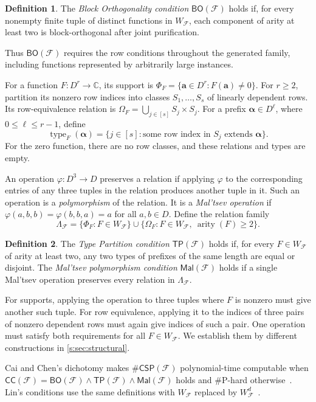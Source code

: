 \documentclass[11pt,letterpaper,onecolumn]{article}
\theoremstyle{plain}
\theoremstyle{definition}
\newtheorem{definition}[definition]{Definition}
\theoremstyle{remark}
\newcommand{\cF}{\mathcal F}
\newcommand{\CC}{\mathsf{CC}}
\newcommand{\BO}{\mathsf{BO}}
\newcommand{\TP}{\mathsf{TP}}
\newcommand{\Mal}{\mathsf{Mal}}
\newcommand{\CSP}[1]{\mathsf{\#CSP}(#1)}
\newcommand{\WFdeg}[1]{W_{\cF}^{#1}}
\newcommand{\SuppRel}[1]{\Phi_{#1}}
\newcommand{\RowEq}[1]{\Omega_{#1}}
\DeclareMathOperator{\arity}{arity}
\DeclareMathOperator{\typeop}{type}
\begin{document}
\begin{definition}
\label{s:def:bo}
The \emph{Block Orthogonality condition} $\BO(\cF)$ holds if, for every
nonempty finite tuple of distinct functions in $W_{\cF}$, each component
of arity at least two is block-orthogonal after joint purification.
\end{definition}

Thus $\BO(\cF)$ requires the row conditions throughout the generated
family, including functions represented by arbitrarily large instances.

For a function $F:D^r\to\mathbb C$, its support is
$\SuppRel F=\{\mathbf a\in D^r:F(\mathbf a)\ne0\}$.
For $r\ge2$, partition its nonzero row indices into classes
$S_1,\ldots,S_s$ of linearly dependent rows. Its row-equivalence relation
is $\RowEq F=\bigcup_{j\in[s]}S_j\times S_j$.
For a prefix $\boldsymbol\alpha\in D^\ell$, where $0\le\ell\le r-1$,
define
\[
 \typeop_F(\boldsymbol\alpha)
 =\{j\in[s]:\text{some row index in }S_j
                  \text{ extends }\boldsymbol\alpha\}.
\]
For the zero function, there are no row classes, and these relations
and types are empty.

An operation $\varphi:D^3\to D$ preserves a relation if applying
$\varphi$ to the corresponding entries of any three tuples in the
relation produces another tuple in it. Such an operation is a
\emph{polymorphism} of the relation. It is a \emph{Mal'tsev operation}
if $\varphi(a,b,b)=\varphi(b,b,a)=a$ for all $a,b\in D$.
Define the relation family
\[
 \Lambda_{\cF}
 =\{\SuppRel F:F\in W_{\cF}\}
  \cup\{\RowEq F:F\in W_{\cF},\ \arity(F)\ge2\}.
\]

\begin{definition}
\label{s:def:tp-mal}
The \emph{Type Partition condition} $\TP(\cF)$ holds if, for every
$F\in W_{\cF}$ of arity at least two, any two types of prefixes of the
same length are equal or disjoint. The \emph{Mal'tsev polymorphism
condition} $\Mal(\cF)$ holds if a single Mal'tsev operation preserves
every relation in $\Lambda_{\cF}$.
\end{definition}

For supports, applying the operation to three tuples where $F$ is
nonzero must give another such tuple. For row equivalence, applying it
to the indices of three pairs of nonzero dependent rows must again
give indices of such a pair. One operation must satisfy both requirements
for all $F\in W_{\cF}$. We establish them by different constructions
in \cref{s:sec:structural}.

Cai and Chen's dichotomy makes $\CSP{\cF}$ polynomial-time computable when
$\CC(\cF)=\BO(\cF)\wedge\TP(\cF)\wedge\Mal(\cF)$ holds and
$\#\mathrm P$-hard otherwise~\cite[Theorem~1 and
Sections~3.1--3.2]{CaiChen2017}. Lin's conditions use the same definitions
with $W_{\cF}$ replaced by $\WFdeg{d}$~\cite{Lin2021}.
\end{document}
